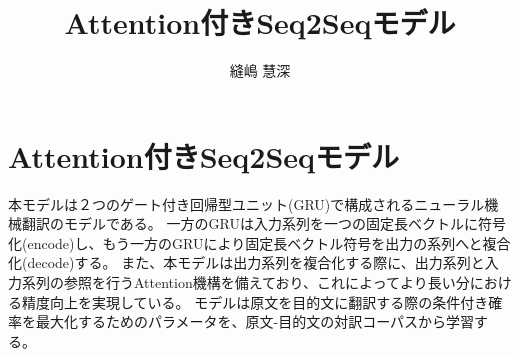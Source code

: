 \documentclass[dvipdfmx,12pt,report]{jsbook}
\begin{document}
\title{{\LARGE Attention付きSeq2Seqモデル}}

\author{縫嶋 慧深}






\beforepreface
\tablespagefalse




\afterpreface


\chapter{Attention付きSeq2Seqモデル}

本モデルは２つのゲート付き回帰型ユニット(GRU)で構成されるニューラル機械翻訳のモデルである。
一方のGRUは入力系列を一つの固定長ベクトルに符号化(encode)し、もう一方のGRUにより固定長ベクトル符号を出力の系列へと複合化(decode)する。
また、本モデルは出力系列を複合化する際に、出力系列と入力系列の参照を行うAttention機構を備えており、これによってより長い分における精度向上を実現している。
モデルは原文を目的文に翻訳する際の条件付き確率を最大化するためのパラメータを、原文-目的文の対訳コーパスから学習する。
\end{document}
